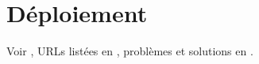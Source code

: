 \chapter{D\'eploiement}
\label{annex:deploiement}

Voir , URLs list\'ees en , probl\`emes et solutions en .
